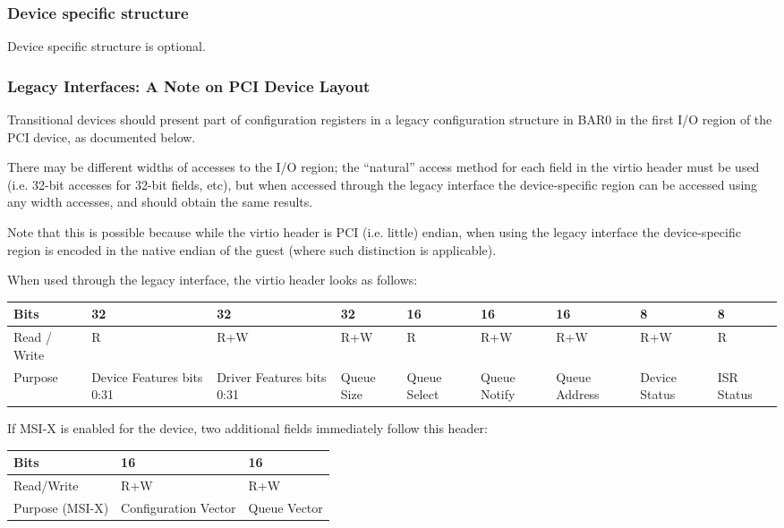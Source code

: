 \subsubsection{Device specific structure}\label{sec:Virtio Transport Options / Virtio Over PCI Bus / PCI Device Layout / Device specific structure}

Device specific structure is optional.

\subsubsection{Legacy Interfaces: A Note on PCI Device Layout}\label{sec:Virtio Transport Options / Virtio Over PCI Bus / PCI Device Layout / Legacy Interfaces: A Note on PCI Device Layout}

Transitional devices should present part of configuration
registers in a legacy configuration structure in BAR0 in the first I/O
region of the PCI device, as documented below.

There may be different widths of accesses to the I/O region; the
“natural” access method for each field in the virtio header must be
used (i.e. 32-bit accesses for 32-bit fields, etc), but 
when accessed through the legacy interface the
device-specific region can be accessed using any width accesses, and
should obtain the same results.

Note that this is possible because while the virtio header is PCI
(i.e. little) endian, when using the legacy interface the device-specific
region is encoded in the native endian of the guest (where such distinction is
applicable).

When used through the legacy interface, the virtio header looks as follows:

\begin{tabularx}{\textwidth}{ |X||X|X|X|X|X|X|X|X| }
\hline
 Bits & 32 & 32 & 32 & 16 & 16 & 16 & 8 & 8 \\
\hline
 Read / Write & R & R+W & R+W & R & R+W & R+W & R+W & R \\
\hline
 Purpose & Device Features bits 0:31 & Driver Features bits 0:31 &
  Queue Size & Queue Select & Queue Notify & Queue Address &
  Device Status & ISR \newline Status \\
\hline
\end{tabularx}

If MSI-X is enabled for the device, two additional fields
immediately follow this header:

\begin{tabular}{ |l||l|l| }
\hline
Bits       & 16             & 16     \\
\hline
Read/Write & R+W            & R+W    \\
\hline
Purpose (MSI-X) & Configuration Vector  & Queue Vector \\
\hline
\end{tabular}

